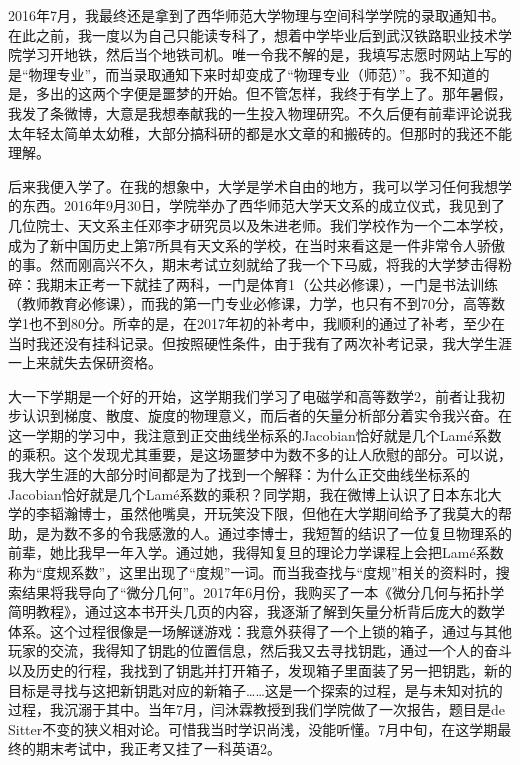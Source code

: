 2016年7月，我最终还是拿到了西华师范大学物理与空间科学学院的录取通知书。在此之前，我一度以为自己只能读专科了，想着中学毕业后到武汉铁路职业技术学院学习开地铁，然后当个地铁司机。唯一令我不解的是，我填写志愿时网站上写的是“物理专业”，而当录取通知下来时却变成了“物理专业（师范）”。我不知道的是，多出的这两个字便是噩梦的开始。但不管怎样，我终于有学上了。那年暑假，我发了条微博，大意是我想奉献我的一生投入物理研究。不久后便有前辈评论说我太年轻太简单太幼稚，大部分搞科研的都是水文章的和搬砖的。但那时的我还不能理解。

	    后来我便入学了。在我的想象中，大学是学术自由的地方，我可以学习任何我想学的东西。2016年9月30日，学院举办了西华师范大学天文系的成立仪式，我见到了几位院士、天文系主任邓李才研究员以及朱进老师。我们学校作为一个二本学校，成为了新中国历史上第7所具有天文系的学校，在当时来看这是一件非常令人骄傲的事。然而刚高兴不久，期末考试立刻就给了我一个下马威，将我的大学梦击得粉碎：我期末正考一下就挂了两科，一门是体育1（公共必修课），一门是书法训练（教师教育必修课），而我的第一门专业必修课，力学，也只有不到70分，高等数学1也不到80分。所幸的是，在2017年初的补考中，我顺利的通过了补考，至少在当时我还没有挂科记录。但按照硬性条件，由于我有了两次补考记录，我大学生涯一上来就失去保研资格。
	
	    大一下学期是一个好的开始，这学期我们学习了电磁学和高等数学2，前者让我初步认识到梯度、散度、旋度的物理意义，而后者的矢量分析部分着实令我兴奋。在这一学期的学习中，我注意到正交曲线坐标系的Jacobian恰好就是几个Lamé系数的乘积。这个发现尤其重要，是这场噩梦中为数不多的让人欣慰的部分。可以说，我大学生涯的大部分时间都是为了找到一个解释：为什么正交曲线坐标系的Jacobian恰好就是几个Lamé系数的乘积？同学期，我在微博上认识了日本东北大学的李韬瀚博士，虽然他嘴臭，开玩笑没下限，但他在大学期间给予了我莫大的帮助，是为数不多的令我感激的人。通过李博士，我短暂的结识了一位复旦物理系的前辈，她比我早一年入学。通过她，我得知复旦的理论力学课程上会把Lamé系数称为“度规系数”，这里出现了“度规”一词。而当我查找与“度规”相关的资料时，搜索结果将我导向了“微分几何”。2017年6月份，我购买了一本《微分几何与拓扑学简明教程》，通过这本书开头几页的内容，我逐渐了解到矢量分析背后庞大的数学体系。这个过程很像是一场解谜游戏：我意外获得了一个上锁的箱子，通过与其他玩家的交流，我得知了钥匙的位置信息，然后我又去寻找钥匙，通过一个人的奋斗以及历史的行程，我找到了钥匙并打开箱子，发现箱子里面装了另一把钥匙，新的目标是寻找与这把新钥匙对应的新箱子……这是一个探索的过程，是与未知对抗的过程，我沉溺于其中。当年7月，闫沐霖教授到我们学院做了一次报告，题目是de Sitter不变的狭义相对论。可惜我当时学识尚浅，没能听懂。7月中旬，在这学期最终的期末考试中，我正考又挂了一科英语2。

